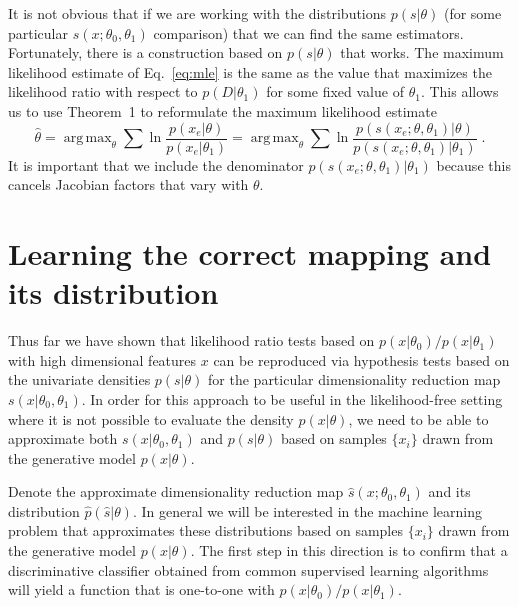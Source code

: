 \documentclass[aoas,preprint]{imsart}
\DeclareMathOperator*{\argmax}{arg\,max}
\numberwithin{equation}{section}
\theoremstyle{plain}
\begin{document}
It is not obvious that if we are working with the distributions $p(s|\theta)$ (for some particular $s(x; \theta_0, \theta_1)$ comparison) that we can find the same estimators. 
Fortunately, there is a construction based on $p(s|\theta)$ that works. The maximum likelihood estimate of Eq.~\ref{eq:mle} is the same as the value that maximizes the likelihood ratio with respect to $p(D|\theta_1)$ for some fixed value of $\theta_1$. This allows us to use Theorem~1 to reformulate the maximum likelihood estimate
\begin{equation}\label{eq:mle_withs}
\hat{\theta} = %
\argmax_\theta  \sum \ln \frac{p(x_e | \theta)}{p(x_e|\theta_1)} = \argmax_\theta  \sum \ln \frac{p(s(x_e; \theta, \theta_1) | \theta)}{p(s(x_e; \theta, \theta_1) |\theta_1)} \; .
\end{equation}
It is important that we include the denominator $p(s(x_e; \theta, \theta_1) |\theta_1)$ because this cancels Jacobian factors that vary with $\theta$.

\section{Learning the correct mapping and its distribution}\label{S:classifier}

Thus far we have shown that likelihood ratio tests based on $p(x|\theta_0)/p(x|\theta_1)$ with high dimensional features $x$ can be reproduced via hypothesis tests based on the univariate densities $p(s|\theta)$ for the particular dimensionality reduction map $s(x|\theta_0, \theta_1)$.
In order for this approach to be useful in the likelihood-free setting where it is not possible to evaluate the density $p(x|\theta)$, we need to be able to approximate both $s(x|\theta_0, \theta_1)$ and $p(s|\theta)$ based on samples $\{x_i\}$ drawn from the generative model $p(x|\theta)$.  

Denote the approximate dimensionality reduction map $\hat{s}(x; \theta_0, \theta_1)$ and its distribution $\hat{p}(\hat{s}|\theta)$. In general we will be interested in the machine learning problem that approximates these distributions based on samples $\{x_i\}$ drawn from the generative model $p(x|\theta)$.  
The first step in this direction is to confirm that a discriminative classifier obtained from common supervised learning algorithms will yield a function that is one-to-one with $p(x|\theta_0)/p(x|\theta_1)$.
\end{document}
